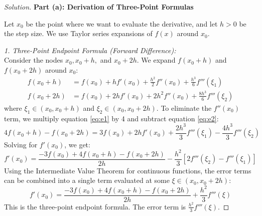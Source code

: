 \documentclass[11pt, a4paper]{article}
\newif\ifsolutionnewpage
\newenvironment{solution}
  {\begin{proof}[Solution]}
  {\end{proof}\ifsolutionnewpage\newpage\fi}
\begin{document}
\begin{solution}
\textbf{Part (a): Derivation of Three-Point Formulas}

Let $x_0$ be the point where we want to evaluate the derivative, and let $h > 0$ be the step size. We use Taylor series expansions of $f(x)$ around $x_0$.

\vspace{0.2cm}
\textit{1. Three-Point Endpoint Formula (Forward Difference):} \\
Consider the nodes $x_0, x_0+h,$ and $x_0+2h$. We expand $f(x_0+h)$ and $f(x_0+2h)$ around $x_0$:
\begin{align}
f(x_0+h) &= f(x_0) + hf'(x_0) + \frac{h^2}{2}f''(x_0) + \frac{h^3}{6}f'''(\xi_1) \label{eq:e1} \\
f(x_0+2h) &= f(x_0) + 2hf'(x_0) + 2h^2f''(x_0) + \frac{8h^3}{6}f'''(\xi_2) \label{eq:e2}
\end{align}
where $\xi_1 \in (x_0, x_0+h)$ and $\xi_2 \in (x_0, x_0+2h)$.
To eliminate the $f''(x_0)$ term, we multiply equation \eqref{eq:e1} by 4 and subtract equation \eqref{eq:e2}:
\begin{equation*}
4f(x_0+h) - f(x_0+2h) = 3f(x_0) + 2hf'(x_0) + \frac{2h^3}{3}f'''(\xi_1) - \frac{4h^3}{3}f'''(\xi_2)
\end{equation*}
Solving for $f'(x_0)$, we get:
\begin{equation*}
f'(x_0) = \frac{-3f(x_0) + 4f(x_0+h) - f(x_0+2h)}{2h} - \frac{h^2}{3}\left[ 2f'''(\xi_2) - f'''(\xi_1) \right]
\end{equation*}
Using the Intermediate Value Theorem for continuous functions, the error terms can be combined into a single term evaluated at some $\xi \in (x_0, x_0+2h)$:
\begin{equation}
f'(x_0) = \frac{-3f(x_0) + 4f(x_0+h) - f(x_0+2h)}{2h} + \frac{h^2}{3}f'''(\xi)
\end{equation}
This is the three-point endpoint formula. The error term is $\frac{h^2}{3}f'''(\xi)$.


\end{solution}
\end{document}
